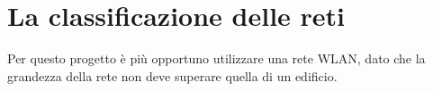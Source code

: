 \section{La classificazione delle reti}
\hspace{24pt}Per questo progetto è più opportuno utilizzare una rete WLAN, dato che la grandezza della rete non deve superare quella di un edificio.